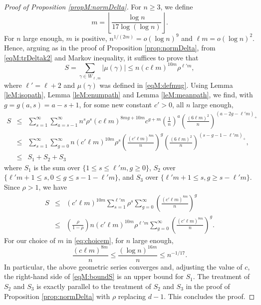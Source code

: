 \documentclass[11pt]{article}
\newcommand{\PAR}[1]{{{\left(#1\right)}}} %
\newcommand{\1}{1\!\!{\sf I}}\newcommand{\IND}{\1}
\begin{document}
\begin{proof}[Proof of Proposition \ref{propM:normDelta}]
For $n \geq 3$, we define 
\begin{equation}\label{eqM:choicem}
m = \left\lfloor  \frac{ \log n }{17 \log (\log n)} \right\rfloor.
\end{equation}
For $n$ large enough, $m$ is positive, $n ^{  1 / (2m) } = o ( \log n )^{9}$ and $\ell m = o ( \log n) ^2$. Hence, arguing as in the proof of Proposition  \ref{prop:normDelta}, from \eqref{eqM:trDeltak2} and Markov inequality, it suffices to prove that 
\begin{equation}\label{eqM:boundS}
S = \sum_{\gamma \in W_{\ell,m} }   | \mu(\gamma) | \leq n  (c \ell m )^{10  m} \rho^{ \ell' m},
\end{equation}
where $\ell' = \ell +2$ and $\mu(\gamma)$ was defined in \eqref{eqM:defmug}. Using Lemma \ref{leM:isopath}, Lemma \ref{leM:enumpath} and Lemma \ref{leM:meanpath}, we find, with $g = g(a,s) = a - s +1$, for some new constant $c'>0$, all $n$ large enough,
\begin{eqnarray*}
S & \leq &  \sum_{s=1}^{\infty} \sum_{a = s - 1} ^{ \infty } n^s    \rho^{s} (c \ell  m )^{8 m g + 10  m} c^{g + m}  \PAR{\frac{ 1 }{n} }^a   \PAR{\frac{ (6\ell m)^2 }{n} } ^{  (a -2g  - \ell' m)_+} \nonumber\\
& \leq &   \sum_{s=1}^{\infty} \sum_{g=0} ^{\infty} n  (c'  \ell  m)^{10 m}    \rho^{s}  \PAR{\frac{ (c' \ell m) ^{8m} }{ n } }^{g} \PAR{\frac{ (6\ell m)^2 }{n} } ^{  (s - g - 1 -  \ell ' m)_+},\\
& \leq &  S_1 + S_2  + S_3 \label{eqM:Sboundddd}
 \end{eqnarray*}
where $S_1$ is the sum over $\{ 1 \leq s \leq \ell' m, g \geq 0 \}$, $S_2$ over $\{\ell' m+1 \leq s , 0 \leq g \leq s - 1 - \ell' m \}$, and $S_3$ over $\{ \ell' m+1 \leq s , g \geq s - \ell' m\}$. Since $\rho > 1$, we have
\begin{eqnarray*}
S &\leq &     (c' \ell   m)^{10 m}   \sum_{s=1}^{ \ell' m} \rho^{s} \sum_{g=0} ^{ \infty } \PAR{\frac{  (c' \ell m) ^{8m} }{ n } }^{g} \\
& \leq & \PAR{\frac{\rho}{ 1-\rho}}  n (c'  \ell  m )^{10 m} \rho^{\ell'm} \sum_{g=0} ^{ \infty } \PAR{\frac{  (c' \ell m) ^{8m} }{ n } }^{g}.
\end{eqnarray*}
For our choice of $m$ in \eqref{eq:choicem}, for $n$ large enough, 
$$
\frac{   (c \ell m) ^{8m} }{ n } \leq \frac{( \log n )^{16m} }{n} \leq n^{-1/17}. 
$$
In particular, the above geometric series converges  and, adjusting the value of $c$,  the right-hand side of \eqref{eqM:boundS} is an upper bound for $S_1$.  The treatment of $S_2$ and $S_3$ is exactly parallel to the treatment of $S_2$ and $S_3$ in  the proof of Proposition  \ref{prop:normDelta} with $\rho$ replacing $d-1$.  This concludes the proof. 
\end{proof}
\end{document}
